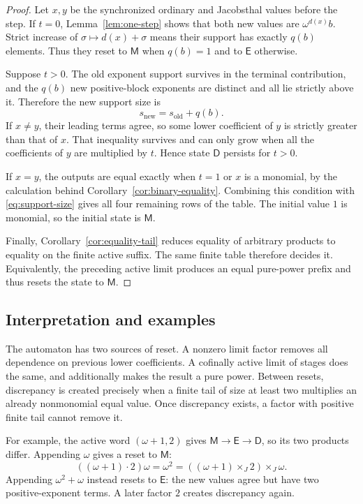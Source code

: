 \documentclass[11pt,letterpaper]{article}
\theoremstyle{definition}
\theoremstyle{remark}
\newcommand{\J}{\mathbin{\times_{\!J}}}
\begin{document}
\begin{proof}
Let $x,y$ be the synchronized ordinary and Jacobsthal values before the
step. If $t=0$, Lemma~\ref{lem:one-step} shows that both new values are
$\omega^{d(x)}b$. Strict increase of $\sigma\mapsto d(x)+\sigma$
means their support has exactly $q(b)$ elements. Thus they reset to
$\mathsf M$ when $q(b)=1$ and to $\mathsf E$ otherwise.

Suppose $t>0$. The old exponent support survives in the terminal
contribution, and the $q(b)$ new positive-block exponents are distinct
and all lie strictly above it. Therefore the new support size is
\begin{equation}\label{eq:support-size}
 s_{\mathrm{new}}=s_{\mathrm{old}}+q(b).
\end{equation}
If $x\neq y$, their leading terms agree, so some lower coefficient of
$y$ is strictly greater than that of $x$. That inequality survives and
can only grow when all the coefficients of $y$ are multiplied by $t$.
Hence state $\mathsf D$ persists for $t>0$.

If $x=y$, the outputs are equal exactly when $t=1$ or $x$ is a monomial,
by the calculation behind Corollary~\ref{cor:binary-equality}. Combining
this condition with \eqref{eq:support-size} gives all four remaining
rows of the table. The initial value $1$ is monomial, so the initial
state is $\mathsf M$.

Finally, Corollary~\ref{cor:equality-tail} reduces equality of arbitrary
products to equality on the finite active suffix. The same finite table
therefore decides it. Equivalently, the preceding active limit produces
an equal pure-power prefix and thus resets the state to $\mathsf M$.
\end{proof}

\subsection{Interpretation and examples}

The automaton has two sources of reset. A nonzero limit factor removes
all dependence on previous lower coefficients. A cofinally active limit
of stages does the same, and additionally makes the result a pure power.
Between resets, discrepancy is created precisely when a finite tail of
size at least two multiplies an already nonmonomial equal value.
Once discrepancy exists, a factor with positive finite tail cannot
remove it.

For example, the active word $(\omega+1,2)$ gives
$\mathsf M\to\mathsf E\to\mathsf D$, so its two products differ.
Appending $\omega$ gives a reset to $\mathsf M$:
\[
 ((\omega+1)\cdot2)\omega=\omega^2
   =((\omega+1)\J2)\J\omega.
\]
Appending $\omega^2+\omega$ instead resets to $\mathsf E$: the new values
agree but have two positive-exponent terms. A later factor $2$ creates
discrepancy again.
\end{document}

